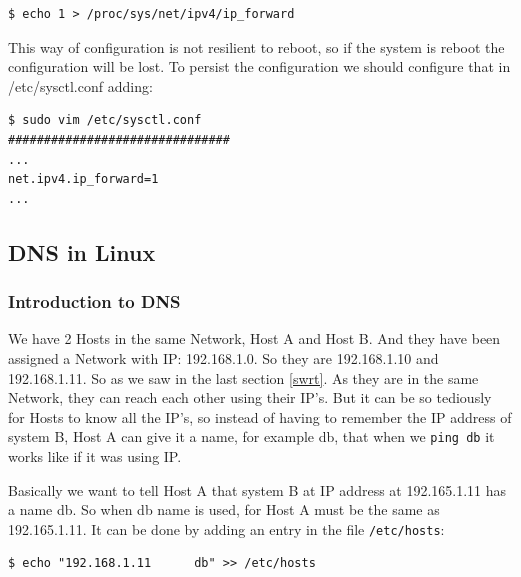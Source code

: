 \documentclass{article}
\newenvironment{blocktemplateIII}[1]{%
    \tcolorbox[beamer,%
    noparskip,breakable,
    ,colframe=Red,%
    colbacklower=LimeGreen!75!LightGreen,%
    title=#1]}%
    {\endtcolorbox}
\newenvironment{codetemplate}[1][]{%
  \mybasecolorbox[#1]
  \itshape
}{%
  \endmybasecolorbox
}
\begin{document}
\begin{codetemplate}{}
\begin{verbatim}
$ echo 1 > /proc/sys/net/ipv4/ip_forward
\end{verbatim}
\end{codetemplate}

\begin{blocktemplateIII}{WARNING}
This way of configuration is not resilient to reboot, so if the system is reboot the configuration will be lost. To persist the configuration we should configure that in /etc/sysctl.conf adding:
\begin{codetemplate}{}
\begin{verbatim}
$ sudo vim /etc/sysctl.conf
###############################
...
net.ipv4.ip_forward=1
...
\end{verbatim}
\end{codetemplate}

\end{blocktemplateIII}

\subsection{DNS in Linux}

\subsubsection{Introduction to DNS}

We have 2 Hosts in the same Network, Host A and Host B. And they have been assigned a Network with IP: 192.168.1.0. So they are 192.168.1.10 and 192.168.1.11. So as we saw in the last section \ref{swrt}. As they are in the same Network, they can reach each other using their IP's. But it can be so tediously for Hosts to know all the IP's, so instead of having to remember the IP address of system B, Host A can give it a name, for example db, that when we \verb|ping db| it works like if it was using IP.

Basically we want to tell Host A that system B at IP address at 192.165.1.11 has a name db. So when db name is used, for Host A must be the same as 192.165.1.11. It can be done by adding an entry in the file \verb|/etc/hosts|:

\begin{codetemplate}{}
\begin{verbatim}
$ echo "192.168.1.11      db" >> /etc/hosts
\end{verbatim}
\end{codetemplate}
\end{document}
